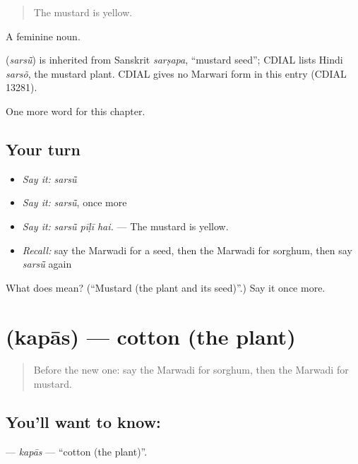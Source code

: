 \begin{quote}
The mustard is yellow.
\end{quote}

A feminine noun.

\begin{cousinweb}
\textbf{} (\emph{sarsū̃}) is inherited from Sanskrit \emph{sarṣapa}, \textquotedblleft{}mustard seed\textquotedblright{}; CDIAL lists Hindi \emph{sarsõ}, the mustard plant. CDIAL gives no Marwari form in this entry (CDIAL 13281).
\end{cousinweb}

\begin{grammarlens}[title={What you've built}]
One more word for this chapter.
\end{grammarlens}

\subsection*{Your turn}
\begin{itemize}
\raggedright
  \item \emph{Say it:} \emph{sarsū̃}
  \item \emph{Say it:} \emph{sarsū̃}, once more
  \item \emph{Say it:} \emph{sarsū̃ pīḷī hai.} — The mustard is yellow.
  \item \emph{Recall:} say the Marwadi for a seed, then the Marwadi for sorghum, then say \emph{sarsū̃} again
\end{itemize}

\begin{tcolorbox}[breakable,colback=teal!4,colframe=teal!35!black,title={Before you move on}]
What does  mean? (\textquotedblleft{}Mustard (the plant and its seed)\textquotedblright{}.) Say it once more.
\end{tcolorbox}
\section[\texorpdfstring{\mw{कपास} (kapās)}{कपास (kapās)}]{ (kapās) — cotton (the plant)}

\label{lesson:MW-C239-kapas}



\begin{quote}
Before the new one: say the Marwadi for sorghum, then the Marwadi for mustard.
\end{quote}

\subsection*{You'll want to know: }
\textbf{} — \emph{kapās} — \textquotedblleft{}cotton (the plant)\textquotedblright{}.

